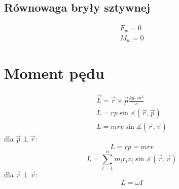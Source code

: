       \subsection{Równowaga bryły sztywnej}
        \begin{gather}
          F_w = 0\\
          M_w = 0
        \end{gather}
    \section{Moment pędu}
      \begin{gather}
        \vec L = \vec r \times\vec p \unit{\frac{kg\cdot m^2}{s}}\\
        L = rp\sin\measuredangle(\vec r,\vec p)\\
        L = mrv\sin\measuredangle(\vec r,\vec v)
      \end{gather}
      dla $\vec p \perp \vec r$:
      \begin{equation}
        L = rp = mrv
      \end{equation}
      \begin{equation}
        L = \sum_{i=1}^n m_ir_iv_i\sin\measuredangle(\vec r,\vec v)
      \end{equation}
      dla $\vec r \perp \vec v$:
      \begin{equation}
        L = \omega I
      \end{equation}
